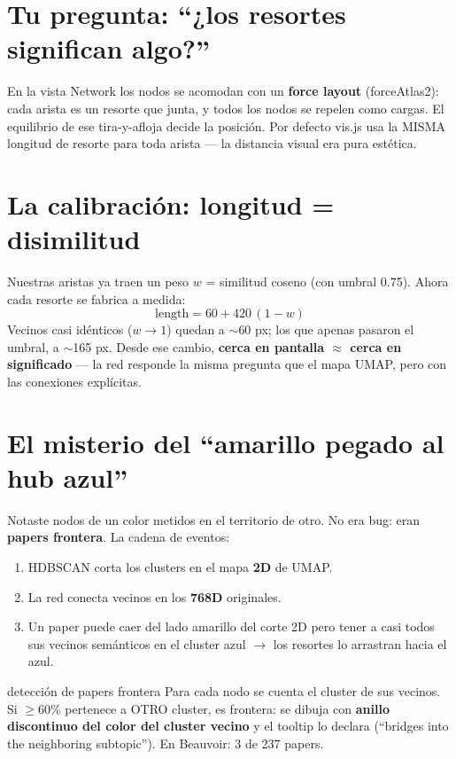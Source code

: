 \documentclass[11pt,a4paper]{article}
\begin{document}
\section{Tu pregunta: ``¿los resortes significan algo?''}

En la vista Network los nodos se acomodan con un \textbf{force layout} (forceAtlas2):
cada arista es un resorte que junta, y todos los nodos se repelen como cargas. El
equilibrio de ese tira-y-afloja decide la posición. Por defecto vis.js usa la MISMA
longitud de resorte para toda arista — la distancia visual era pura estética.

\section{La calibración: longitud = disimilitud}

Nuestras aristas ya traen un peso $w$ = similitud coseno (con umbral 0.75). Ahora cada
resorte se fabrica a medida:
\[
\mathrm{length} = 60 + 420\,(1 - w)
\]
Vecinos casi idénticos ($w \to 1$) quedan a $\sim$60 px; los que apenas pasaron el
umbral, a $\sim$165 px. Desde ese cambio, \textbf{cerca en pantalla $\approx$ cerca en
significado} — la red responde la misma pregunta que el mapa UMAP, pero con las
conexiones explícitas.

\section{El misterio del ``amarillo pegado al hub azul''}

Notaste nodos de un color metidos en el territorio de otro. No era bug: eran
\textbf{papers frontera}. La cadena de eventos:

\begin{enumerate}
  \item HDBSCAN corta los clusters en el mapa \textbf{2D} de UMAP.
  \item La red conecta vecinos en los \textbf{768D} originales.
  \item Un paper puede caer del lado amarillo del corte 2D pero tener a casi todos sus
        vecinos semánticos en el cluster azul $\rightarrow$ los resortes lo arrastran
        hacia el azul.
\end{enumerate}

\begin{concepto}{detección de papers frontera}
Para cada nodo se cuenta el cluster de sus vecinos. Si $\geq 60\%$ pertenece a OTRO
cluster, es frontera: se dibuja con \textbf{anillo discontinuo del color del cluster
vecino} y el tooltip lo declara (``bridges into the neighboring subtopic''). En
Beauvoir: 3 de 237 papers.
\end{concepto}
\end{document}
